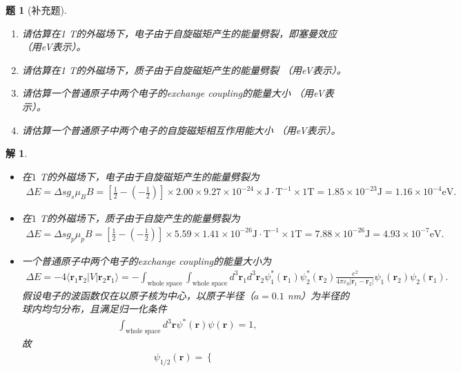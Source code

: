 \documentclass[UTF8,10pt,a4paper]{article}
\theoremstyle{Problem}
\newtheorem{prob}{题}
\theoremstyle{Solution}
\newtheorem*{sol}{解}
\providecommand{\abs}[1]{\left\lvert#1\right\rvert}
\begin{document}
\begin{prob}[补充题]
    \begin{enumerate}
        \item 请估算在1 T的外磁场下，电子由于自旋磁矩产生的能量劈裂，即塞曼效应（用eV表示）。
        \item 请估算在1 T的外磁场下，质子由于自旋磁矩产生的能量劈裂 （用eV表示）。
        \item 请估算一个普通原子中两个电子的exchange coupling的能量大小 （用eV表示）。
        \item 请估算一个普通原子中两个电子的自旋磁矩相互作用能大小 （用eV表示）。
    \end{enumerate}
\end{prob}
\begin{sol}
\begin{itemize}
    \item 在$1$ T的外磁场下，电子由于自旋磁矩产生的能量劈裂为
    \begin{align}
        \Delta E=\Delta sg_s\mu_BB=\left[\frac{1}{2}-\left(-\frac{1}{2}\right)\right]\times 2.00\times 9.27\times 10^{-24}\times \text{J}\cdot\text{T}^{-1}\times 1\text{T}=1.85\times 10^{-23}\text{J}=1.16\times 10^{-4}\text{eV}.
    \end{align}
    \item 在$1$ T的外磁场下，质子由于自旋产生的能量劈裂为
    \begin{align}
        \Delta E=\Delta sg_p\mu_pB=\left[\frac{1}{2}-\left(-\frac{1}{2}\right)\right]\times 5.59\times 1.41\times 10^{-26}\text{J}\cdot\text{T}^{-1}\times 1\text{T}=7.88\times 10^{-26}\text{J}=4.93\times 10^{-7}\text{eV}.
    \end{align}
    \item 一个普通原子中两个电子的exchange coupling的能量大小为
    \begin{align}
        \Delta E=-4\langle\bm{r}_1\bm{r}_2\rvert V\lvert\bm{r}_2\bm{r}_1\rangle=-\int_{\text{whole space}}\int_{\text{whole space}}d^3\bm{r}_1d^3\bm{r}_2\psi_1^*(\bm{r}_1)\psi_2^*(\bm{r}_2)\frac{e^2}{4\pi\varepsilon_0\abs{\bm{r}_1-\bm{r}_2}}\psi_1(\bm{r}_2)\psi_2(\bm{r}_1).
    \end{align}
    假设电子的波函数仅在以原子核为中心，以原子半径（$a=0.1$ nm）为半径的球内均匀分布，且满足归一化条件
    \begin{align}
        \int_{\text{whole space}}d^3\bm{r}\psi^*(\bm{r})\psi(\bm{r})=1,
    \end{align}
    故
    \begin{align}
        \psi_{1/2}(\bm{r})=\left\{\begin{array}{ll}

\end{array}
\end{align}
\end{itemize}
\end{sol}
\end{document}
